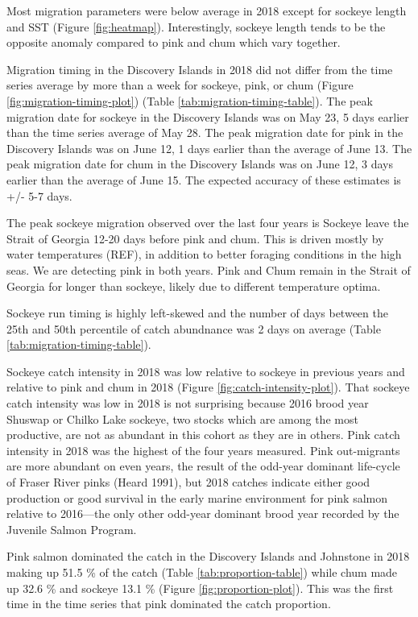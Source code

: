 \documentclass[fleqn,10pt]{wlpeerj} %
\begin{document}
Most migration parameters were below average in 2018 except for sockeye length and SST (Figure \ref{fig:heatmap}). Interestingly, sockeye length tends to be the opposite anomaly compared to pink and chum which vary together.

Migration timing in the Discovery Islands in 2018 did not differ from the time series average by more than a week for sockeye, pink, or chum (Figure \ref{fig:migration-timing-plot}) (Table \ref{tab:migration-timing-table}). The peak migration date for sockeye in the Discovery Islands was on May 23, 5 days earlier than the time series average of May 28. The peak migration date for pink in the Discovery Islands was on June 12, 1 days earlier than the average of June 13. The peak migration date for chum in the Discovery Islands was on June 12, 3 days earlier than the average of June 15. The expected accuracy of these estimates is +/- 5-7 days.

The peak sockeye migration observed over the last four years is
Sockeye leave the Strait of Georgia 12-20 days before pink and chum. This is driven mostly by water temperatures (REF), in addition to better foraging conditions in the high seas.
We are detecting pink in both years.
Pink and Chum remain in the Strait of Georgia for longer than sockeye, likely due to different temperature optima.

Sockeye run timing is highly left-skewed and the number of days between the 25th and 50th percentile of catch abundnance was 2 days on average (Table \ref{tab:migration-timing-table}).

Sockeye catch intensity in 2018 was low relative to sockeye in previous years and relative to pink and chum in 2018 (Figure \ref{fig:catch-intensity-plot}). That sockeye catch intensity was low in 2018 is not surprising because 2016 brood year Shuswap or Chilko Lake sockeye, two stocks which are among the most productive, are not as abundant in this cohort as they are in others. Pink catch intensity in 2018 was the highest of the four years measured. Pink out-migrants are more abundant on even years, the result of the odd-year dominant life-cycle of Fraser River pinks (Heard 1991), but 2018 catches indicate either good production or good survival in the early marine environment for pink salmon relative to 2016---the only other odd-year dominant brood year recorded by the Juvenile Salmon Program.

Pink salmon dominated the catch in the Discovery Islands and Johnstone in 2018 making up 51.5 \% of the catch (Table \ref{tab:proportion-table}) while chum made up 32.6 \% and sockeye 13.1 \% (Figure \ref{fig:proportion-plot}). This was the first time in the time series that pink dominated the catch proportion.
\end{document}
